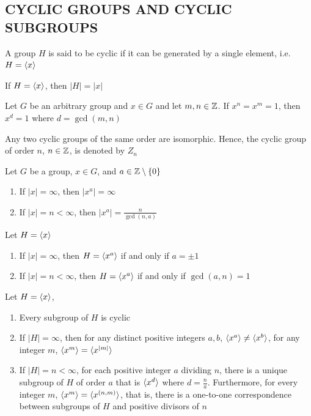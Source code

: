 \subsection{CYCLIC GROUPS AND CYCLIC SUBGROUPS}

\begin{definition}
	A group $H$ is said to be cyclic if it can be generated by a single element, i.e. $H = \langle x\rangle$
\end{definition}

\begin{proposition}
	If $H = \langle x\rangle$, then $|H| = |x|$
\end{proposition}

\begin{proposition}
	Let $G$ be an arbitrary group and $x \in G$ and let $m, n \in \mathbb{Z}$. If $x^n = x^m = 1$, then $x^d = 1$ where $d = \gcd(m, n)$
\end{proposition}

\begin{theorem}
	Any two cyclic groups of the same order are isomorphic. Hence, the cyclic group of order $n$, $n \in \mathbb{Z}$, is denoted by $Z_n$
\end{theorem}

\begin{proposition}
	Let $G$ be a group, $x \in G$, and $a \in \mathbb{Z} \setminus \{0\}$
	\begin{enumerate}
		\item If $|x| = \infty$, then $|x^a| = \infty$
		\item If $|x| = n < \infty$, then $|x^a| = \frac{n}{\gcd(n, a)}$
	\end{enumerate}
\end{proposition}

\begin{proposition}
	Let $H = \langle x\rangle$
	\begin{enumerate}
		\item If $|x| = \infty$, then $H = \langle x^a\rangle$ if and only if $a = \pm 1$
		\item If $|x| = n < \infty$, then $H = \langle x^a\rangle$ if and only if $\gcd(a, n) = 1$
	\end{enumerate}
\end{proposition}

\begin{theorem}
	Let $H = \langle x\rangle$,
	\begin{enumerate}
		\item Every subgroup of $H$ is cyclic
		\item If $|H| = \infty$, then for any distinct positive integers $a, b$, $\langle x^a\rangle \neq \langle x^b\rangle$, for any integer $m$, $\langle x^m\rangle = \langle x^{|m|}\rangle$
		\item If $|H| = n < \infty$, for each positive integer $a$ dividing $n$, there is a unique subgroup of $H$ of order $a$ that is $\langle x^d\rangle$ where $d = \frac{n}{a}$. Furthermore, for every integer $m$, $\langle x^m\rangle = \langle x^{(n, m)}\rangle$, that is, there is a one-to-one correspondence between subgroups of $H$ and positive divisors of $n$
	\end{enumerate}
\end{theorem}

